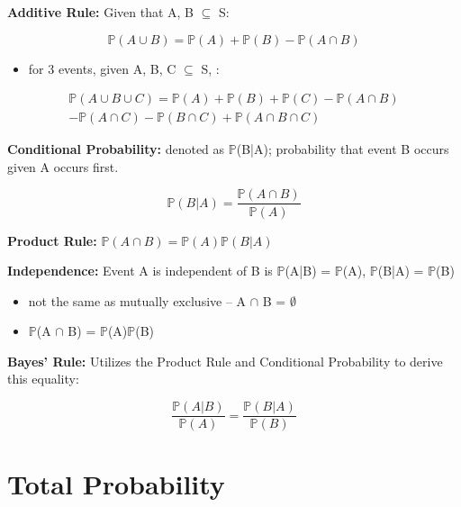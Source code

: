 \documentclass[10pt, letterpaper, twoside]{article}
\begin{document}
\begin{multicols}{2}
\textbf{Additive Rule:} Given that A, B $\subseteq$ S:

\begin{equation*}
    \mathbb{P}(A\cup B) = \mathbb{P}(A) + \mathbb{P}(B) - \mathbb{P}(A\cap B)
\end{equation*}
\begin{itemize}
    \item for 3 events, given A, B, C $\subseteq$ S, :
\end{itemize}
\begin{equation*}
\begin{split}
    \mathbb{P}(A \cup B \cup C) = \mathbb{P}(A) + \mathbb{P}(B) + \mathbb{P}(C) - \mathbb{P}(A\cap B)\\ - \mathbb{P}(A\cap C) - \mathbb{P}(B\cap C) + \mathbb{P}(A\cap B \cap C)
\end{split}
\end{equation*}

\textbf{Conditional Probability:} denoted as $\mathbb{P}$(B|A); probability that event B occurs given A occurs first.

\begin{equation*}
    \mathbb{P}(B|A) = \frac{\mathbb{P}(A\cap B)}{\mathbb{P}(A)}
\end{equation*}

\textbf{Product Rule:} $\mathbb{P}(A\cap B) = \mathbb{P}(A)\mathbb{P}(B|A)$

\textbf{Independence:} Event A is independent of B is $\mathbb{P}$(A|B) = $\mathbb{P}$(A), $\mathbb{P}$(B|A) = $\mathbb{P}$(B)
\begin{itemize}
    \item not the same as mutually exclusive -- A $\cap$ B = $\emptyset$
    \item $\mathbb{P}$(A $\cap$ B) = $\mathbb{P}$(A)$\mathbb{P}$(B)
\end{itemize}
\textbf{Bayes' Rule:} Utilizes the Product Rule and Conditional Probability to derive this equality:

\begin{equation*}
    \frac{\mathbb{P}(A|B)}{\mathbb{P}(A)} = \frac{\mathbb{P}(B|A)}{\mathbb{P}(B)}
\end{equation*}
\section{Total Probability}


\end{multicols}
\end{document}
